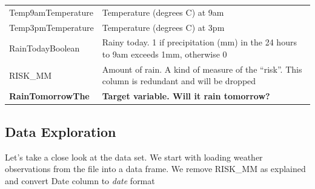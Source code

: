 \begin{longtable}[]{@{}ll@{}}
\begin{minipage}[t]{0.52\columnwidth}\raggedright
Temp9amTemperature\strut
\end{minipage} & \begin{minipage}[t]{0.43\columnwidth}\raggedright
Temperature (degrees C) at 9am\strut
\end{minipage}\tabularnewline
\begin{minipage}[t]{0.52\columnwidth}\raggedright
Temp3pmTemperature\strut
\end{minipage} & \begin{minipage}[t]{0.43\columnwidth}\raggedright
Temperature (degrees C) at 3pm\strut
\end{minipage}\tabularnewline
\begin{minipage}[t]{0.52\columnwidth}\raggedright
RainTodayBoolean\strut
\end{minipage} & \begin{minipage}[t]{0.43\columnwidth}\raggedright
Rainy today. 1 if precipitation (mm) in the 24 hours to 9am exceeds 1mm,
otherwise 0\strut
\end{minipage}\tabularnewline
\begin{minipage}[t]{0.52\columnwidth}\raggedright
RISK\_MM\strut
\end{minipage} & \begin{minipage}[t]{0.43\columnwidth}\raggedright
Amount of rain. A kind of measure of the ``risk''. This column is
redundant and will be dropped\strut
\end{minipage}\tabularnewline
\begin{minipage}[t]{0.52\columnwidth}\raggedright
\textbf{RainTomorrowThe}\strut
\end{minipage} & \begin{minipage}[t]{0.43\columnwidth}\raggedright
\textbf{Target variable. Will it rain tomorrow?}\strut
\end{minipage}\tabularnewline
\bottomrule
\end{longtable}

\hypertarget{data-exploration}{%
\subsection{Data Exploration}\label{data-exploration}}

Let's take a close look at the data set. We start with loading weather
observations from the file into a data frame. We remove RISK\_MM as
explained and convert Date column to \emph{date} format

